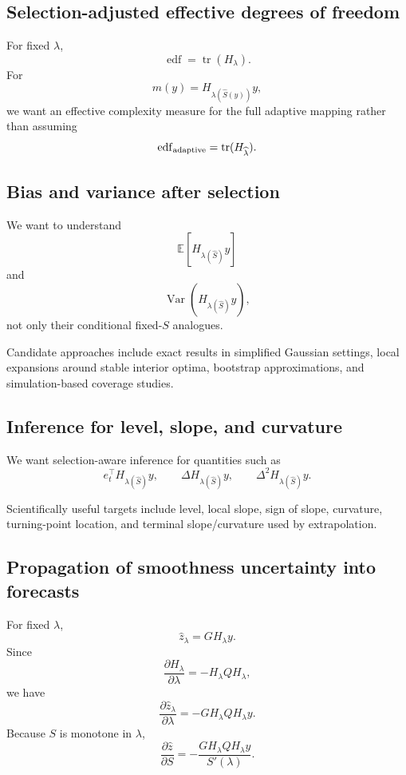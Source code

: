 \documentclass[11pt]{article}
\newcommand{\E}{\mathbb E}
\newcommand{\Var}{\operatorname{Var}}
\newcommand{\tr}{\operatorname{tr}}
\begin{document}
\subsection{Selection-adjusted effective degrees of freedom}

For fixed \(\lambda\),
\[
\operatorname{edf}=\tr(H_\lambda).
\]
For
\[
m(y)=H_{\lambda(\widehat S(y))}y,
\]
we want an effective complexity measure for the full adaptive mapping rather
than assuming
\[
\operatorname{edf}_{\rm adaptive}
=
\tr(H_{\widehat\lambda}).
\]

\subsection{Bias and variance after selection}

We want to understand
\[
\E\left[H_{\lambda(\widehat S)}y\right]
\]
and
\[
\Var\left(H_{\lambda(\widehat S)}y\right),
\]
not only their conditional fixed-\(S\) analogues.

Candidate approaches include exact results in simplified Gaussian settings,
local expansions around stable interior optima, bootstrap approximations, and
simulation-based coverage studies.

\subsection{Inference for level, slope, and curvature}

We want selection-aware inference for quantities such as
\[
e_t^\top H_{\lambda(\widehat S)}y,
\qquad
\Delta H_{\lambda(\widehat S)}y,
\qquad
\Delta^2H_{\lambda(\widehat S)}y.
\]

Scientifically useful targets include level, local slope, sign of slope,
curvature, turning-point location, and terminal slope/curvature used by
extrapolation.

\subsection{Propagation of smoothness uncertainty into forecasts}

For fixed \(\lambda\),
\[
\widehat z_\lambda=GH_\lambda y.
\]
Since
\[
\frac{\partial H_\lambda}{\partial\lambda}
=
-H_\lambda QH_\lambda,
\]
we have
\[
\frac{\partial\widehat z_\lambda}{\partial\lambda}
=
-GH_\lambda QH_\lambda y.
\]
Because \(S\) is monotone in \(\lambda\),
\[
\boxed{
\frac{\partial\widehat z}{\partial S}
=
-\frac{GH_\lambda QH_\lambda y}{S'(\lambda)}.
}
\]
\end{document}
